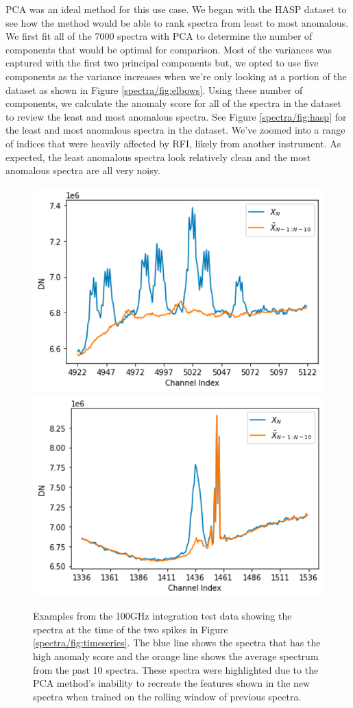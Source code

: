 PCA was an ideal method for this use case. 
We began with the HASP dataset to see how the method would be able to rank spectra from least to most anomalous.
We first fit all of the $7000$ spectra with PCA to determine the number of components that would be optimal for comparison.
Most of the variances was captured with the first two principal components but, we opted to use five components as the variance increases when we're only looking at a portion of the dataset as shown in Figure \ref{spectra/fig:elbows}.
Using these number of components, we calculate the anomaly score for all of the spectra in the dataset to review the least and most anomalous spectra. 
See Figure \ref{spectra/fig:hasp} for the least and most anomalous spectra in the dataset. 
We've zoomed into a range of indices that were heavily affected by RFI, likely from another instrument. 
As expected, the least anomalous spectra look relatively clean and the most anomalous spectra are all very noisy. 

\begin{figure}[t]
    \centering
    \includegraphics[width=0.49\linewidth]{figs/spectra/pca1.png}
    \includegraphics[width=0.49\linewidth]{figs/spectra/pca2.png}
    \caption[Novel Examples from the 100GHz Integration Test]{Examples from the 100GHz integration test data showing the spectra at the time of the two spikes in Figure \ref{spectra/fig:timeseries}. The blue line shows the spectra that has the high anomaly score and the orange line shows the average spectrum from the past 10 spectra. These spectra were highlighted due to the PCA method's inability to recreate the features shown in the new spectra when trained on the rolling window of previous spectra.}
    \label{spectra/fig:100ghz}
\end{figure}

